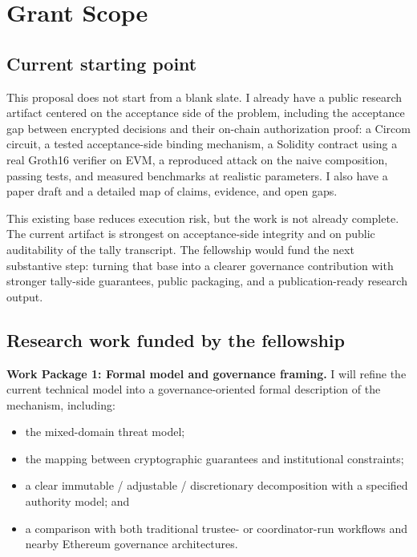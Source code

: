 \documentclass[11pt]{article}
\begin{document}
\section{Grant Scope}

\subsection{Current starting point}

This proposal does not start from a blank slate. I already have a public
research artifact centered on the acceptance side of the problem, including the
acceptance gap between encrypted decisions and their on-chain authorization
proof: a Circom circuit, a tested acceptance-side binding mechanism, a Solidity
contract using a real Groth16 verifier on EVM, a reproduced attack on the naive
composition, passing tests, and measured benchmarks at realistic parameters. I
also have a paper draft and a detailed map of claims, evidence, and open gaps.

This existing base reduces execution risk, but the work is not already
complete. The current artifact is strongest on acceptance-side integrity and on
public auditability of the tally transcript. The fellowship would fund the next
substantive step: turning that base into a clearer governance contribution with
stronger tally-side guarantees, public packaging, and a publication-ready
research output.

\subsection{Research work funded by the fellowship}

\textbf{Work Package 1: Formal model and governance framing.}
I will refine the current technical model into a governance-oriented formal
description of the mechanism, including:

\begin{itemize}[leftmargin=*]
\item the mixed-domain threat model;
\item the mapping between cryptographic guarantees and institutional
      constraints;
\item a clear immutable / adjustable / discretionary decomposition with a
      specified authority model; and
\item a comparison with both traditional trustee- or coordinator-run workflows
      and nearby Ethereum governance architectures.
\end{itemize}
\end{document}
